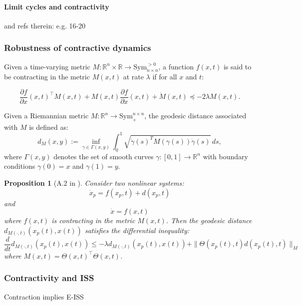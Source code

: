 \documentclass{article}
\newtheorem{proposition}{Proposition}
\theoremstyle{definition} \newtheorem{definition}{Definition}
\theoremstyle{remark} \newtheorem{remark}{Remark}
\newcounter{ct}
\begin{document}
\paragraph{Limit cycles and contractivity}%
\citep{manchester2014transverse} and refs therein: e.g. 16-20


\subsubsection{Robustness of contractive dynamics}\label{sec:contractive_robustness}

Given a time-varying metric \( M : \mathbb{R}^n \times \mathbb{R} \to \text{Sym}_{n \times n}^{>0} \), a function \( f(x,t) \) is said to be contracting in the metric \( M(x,t) \) at rate \( \lambda \) if for all \( x \) and \( t \):

\[
\frac{\partial f}{\partial x} (x,t)^{\top} M(x,t) + M(x,t) \frac{\partial f}{\partial x} (x,t) + \dot{M} (x,t) \preceq -2\lambda M(x,t).
\]


Given a Riemannian metric \( M: \mathbb{R}^n \to \text{Sym}_{+}^{n \times n} \), the geodesic distance associated with \( M \) is defined as:
\begin{equation}
    d_M(x, y) := \inf_{\gamma \in \Gamma(x,y)} \int_0^1 \sqrt{\dot{\gamma}(s)^T M(\gamma(s)) \dot{\gamma}(s)} \, ds,
\end{equation}
where \( \Gamma(x,y) \) denotes the set of smooth curves \( \gamma: [0,1] \to \mathbb{R}^n \) with boundary conditions \( \gamma(0) = x \) and \( \gamma(1) = y \).


\begin{proposition}[A.2 in \citep{zhang2022adversarially}]
Consider two nonlinear systems:
\[
\dot{x}_p = f(x_p, t) + d(x_p, t)
\]
and 
\[
\dot{x} = f(x, t)
\]
where \( f(x, t) \) is contracting in the metric \( M(x,t) \).
 Then the geodesic distance \( d_{M(\cdot,t)}(x_p(t), x(t)) \) satisfies the differential inequality:
\[
\frac{d}{dt} d_{M(\cdot,t)}(x_p(t), x(t)) \leq -\lambda d_{M(\cdot,t)}(x_p(t), x(t)) + \|\Theta(x_p(t),t)d(x_p(t), t)\|_M
\]
where \( M(x,t) = \Theta(x,t)^\top \Theta(x,t) \).
\end{proposition}



\subsubsection{Contractivity and ISS}
Contraction implies E-ISS \citep{zhang2022adversarially}
\end{document}

